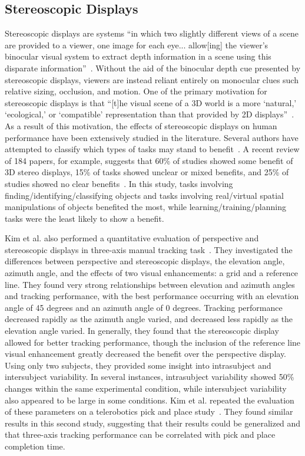 \documentclass[float=false, crop=false]{standalone}
\begin{document}
\subsection{Stereoscopic Displays}
Stereoscopic displays are systems ``in which two slightly different views of a scene are provided to a viewer, one image for each eye... allow[ing] the viewer's binocular visual system to extract depth information in a scene using this disparate information''~\cite{McIntire2014}.
Without the aid of the binocular depth cue presented by stereoscopic displays, viewers are instead reliant entirely on monocular clues such relative sizing, occlusion, and motion.
One of the primary motivation for stereoscopic displays is that ``[t]he visual scene of a 3D world is a more `natural,' `ecological,' or `compatible' representation than that provided by 2D displays''~\cite{Wickens1990}.
As a result of this motivation, the effects of stereoscopic displays on human performance have been extensively studied in the literature.
Several authors have attempted to classify which types of tasks may stand to benefit~\cite{McIntire2014, Wickens1990, Wickens1989, Naikar1998, Dixon2009}.
A recent review of 184 papers, for example, suggests that 60\% of studies showed some benefit of 3D stereo displays, 15\% of tasks showed unclear or mixed benefits, and 25\% of studies showed no clear benefits~\cite{McIntire2014}.
In this study, tasks involving finding/identifying/classifying objects and tasks involving real/virtual spatial manipulations of objects benefited the most, while learning/training/planning tasks were the least likely to show a benefit.

Kim et al. also performed a quantitative evaluation of perspective and stereoscopic displays in three-axis manual tracking task~\cite{Kim1987}.
They investigated the differences between perspective and stereoscopic displays, the elevation angle, azimuth angle, and the effects of two visual enhancements: a grid and a reference line.
They found very strong relationships between elevation and azimuth angles and tracking performance, with the best performance occurring with an elevation angle of 45 degrees and an azimuth angle of 0 degrees.
Tracking performance decreased rapidly as the azimuth angle varied, and decreased less rapidly as the elevation angle varied.
In generally, they found that the stereoscopic display allowed for better tracking performance, though the inclusion of the reference line visual enhancement greatly decreased the benefit over the perspective display.
Using only two subjects, they provided some insight into intrasubject and intersubject variability.
In several instances, intrasubject variability showed 50\% changes within the same experimental condition, while intersubject variability also appeared to be large in some conditions.
Kim et al. repeated the evaluation of these parameters on a telerobotics pick and place study~\cite{WonKim1987}.
They found similar results in this second study, suggesting that their results could be generalized and that three-axis tracking performance can be correlated with pick and place completion time.
\end{document}
